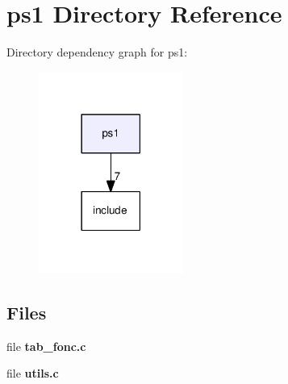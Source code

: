 \section{ps1 Directory Reference}
\label{dir_eb00d8d4373fa374e67cc6e27cf03d82}
Directory dependency graph for ps1\-:\nopagebreak
\begin{figure}[H]
\begin{center}
\leavevmode
\includegraphics[width=134pt]{dir_eb00d8d4373fa374e67cc6e27cf03d82_dep}
\end{center}
\end{figure}
\subsection*{Files}
\begin{DoxyCompactItemize}
\item 
file {\bf tab\-\_\-fonc.\-c}
\item 
file {\bf utils.\-c}
\end{DoxyCompactItemize}
